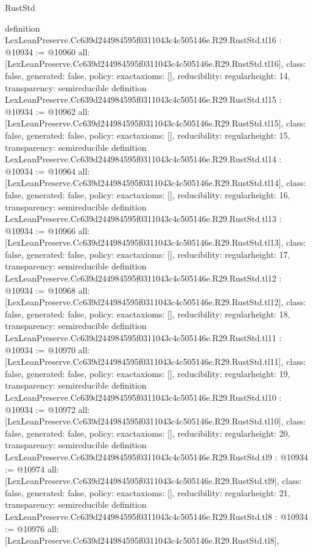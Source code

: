 \begin{lexlean}{RustStd}
\begin{coremodule}
{}
definition LexLeanPreserve.Cc639d244984595f0311043c4c505146e.R29.RustStd.tl16 : @10934 := @10960 {
  all: [LexLeanPreserve.Cc639d244984595f0311043c4c505146e.R29.RustStd.tl16],
  class: false,
  generated: false,
  policy: exact{axioms: []},
  reducibility: regular{height: 14},
  transparency: semireducible
}
definition LexLeanPreserve.Cc639d244984595f0311043c4c505146e.R29.RustStd.tl15 : @10934 := @10962 {
  all: [LexLeanPreserve.Cc639d244984595f0311043c4c505146e.R29.RustStd.tl15],
  class: false,
  generated: false,
  policy: exact{axioms: []},
  reducibility: regular{height: 15},
  transparency: semireducible
}
definition LexLeanPreserve.Cc639d244984595f0311043c4c505146e.R29.RustStd.tl14 : @10934 := @10964 {
  all: [LexLeanPreserve.Cc639d244984595f0311043c4c505146e.R29.RustStd.tl14],
  class: false,
  generated: false,
  policy: exact{axioms: []},
  reducibility: regular{height: 16},
  transparency: semireducible
}
definition LexLeanPreserve.Cc639d244984595f0311043c4c505146e.R29.RustStd.tl13 : @10934 := @10966 {
  all: [LexLeanPreserve.Cc639d244984595f0311043c4c505146e.R29.RustStd.tl13],
  class: false,
  generated: false,
  policy: exact{axioms: []},
  reducibility: regular{height: 17},
  transparency: semireducible
}
definition LexLeanPreserve.Cc639d244984595f0311043c4c505146e.R29.RustStd.tl12 : @10934 := @10968 {
  all: [LexLeanPreserve.Cc639d244984595f0311043c4c505146e.R29.RustStd.tl12],
  class: false,
  generated: false,
  policy: exact{axioms: []},
  reducibility: regular{height: 18},
  transparency: semireducible
}
definition LexLeanPreserve.Cc639d244984595f0311043c4c505146e.R29.RustStd.tl11 : @10934 := @10970 {
  all: [LexLeanPreserve.Cc639d244984595f0311043c4c505146e.R29.RustStd.tl11],
  class: false,
  generated: false,
  policy: exact{axioms: []},
  reducibility: regular{height: 19},
  transparency: semireducible
}
definition LexLeanPreserve.Cc639d244984595f0311043c4c505146e.R29.RustStd.tl10 : @10934 := @10972 {
  all: [LexLeanPreserve.Cc639d244984595f0311043c4c505146e.R29.RustStd.tl10],
  class: false,
  generated: false,
  policy: exact{axioms: []},
  reducibility: regular{height: 20},
  transparency: semireducible
}
definition LexLeanPreserve.Cc639d244984595f0311043c4c505146e.R29.RustStd.tl9 : @10934 := @10974 {
  all: [LexLeanPreserve.Cc639d244984595f0311043c4c505146e.R29.RustStd.tl9],
  class: false,
  generated: false,
  policy: exact{axioms: []},
  reducibility: regular{height: 21},
  transparency: semireducible
}
definition LexLeanPreserve.Cc639d244984595f0311043c4c505146e.R29.RustStd.tl8 : @10934 := @10976 {
  all: [LexLeanPreserve.Cc639d244984595f0311043c4c505146e.R29.RustStd.tl8],
}
\end{coremodule}
\end{lexlean}
